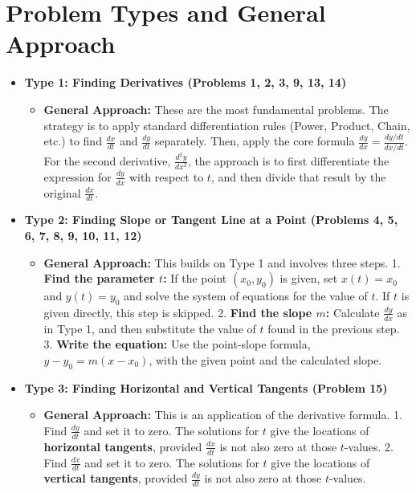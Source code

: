 \documentclass{article}
\begin{document}
\section{Problem Types and General Approach}
\begin{itemize}
    \item \textbf{Type 1: Finding Derivatives (Problems 1, 2, 3, 9, 13, 14)}
        \begin{itemize}
            \item \textbf{General Approach:} These are the most fundamental problems. The strategy is to apply standard differentiation rules (Power, Product, Chain, etc.) to find $\frac{dx}{dt}$ and $\frac{dy}{dt}$ separately. Then, apply the core formula $\frac{dy}{dx} = \frac{dy/dt}{dx/dt}$. For the second derivative, $\frac{d^2y}{dx^2}$, the approach is to first differentiate the expression for $\frac{dy}{dx}$ with respect to $t$, and then divide that result by the original $\frac{dx}{dt}$.
        \end{itemize}
    \item \textbf{Type 2: Finding Slope or Tangent Line at a Point (Problems 4, 5, 6, 7, 8, 9, 10, 11, 12)}
        \begin{itemize}
            \item \textbf{General Approach:} This builds on Type 1 and involves three steps.
            1.  \textbf{Find the parameter $t$:} If the point $(x_0, y_0)$ is given, set $x(t) = x_0$ and $y(t) = y_0$ and solve the system of equations for the value of $t$. If $t$ is given directly, this step is skipped.
            2.  \textbf{Find the slope $m$:} Calculate $\frac{dy}{dx}$ as in Type 1, and then substitute the value of $t$ found in the previous step.
            3.  \textbf{Write the equation:} Use the point-slope formula, $y - y_0 = m(x - x_0)$, with the given point and the calculated slope.
        \end{itemize}
    \item \textbf{Type 3: Finding Horizontal and Vertical Tangents (Problem 15)}
        \begin{itemize}
            \item \textbf{General Approach:} This is an application of the derivative formula.
            1.  Find $\frac{dy}{dt}$ and set it to zero. The solutions for $t$ give the locations of \textbf{horizontal tangents}, provided $\frac{dx}{dt}$ is not also zero at those $t$-values.
            2.  Find $\frac{dx}{dt}$ and set it to zero. The solutions for $t$ give the locations of \textbf{vertical tangents}, provided $\frac{dy}{dt}$ is not also zero at those $t$-values.

\end{itemize}
\end{itemize}
\end{document}

